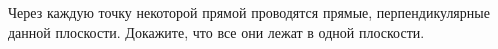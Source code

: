 Через каждую точку некоторой прямой проводятся прямые, перпендикулярные данной плоскости. Докажите, что все они лежат в одной плоскости.